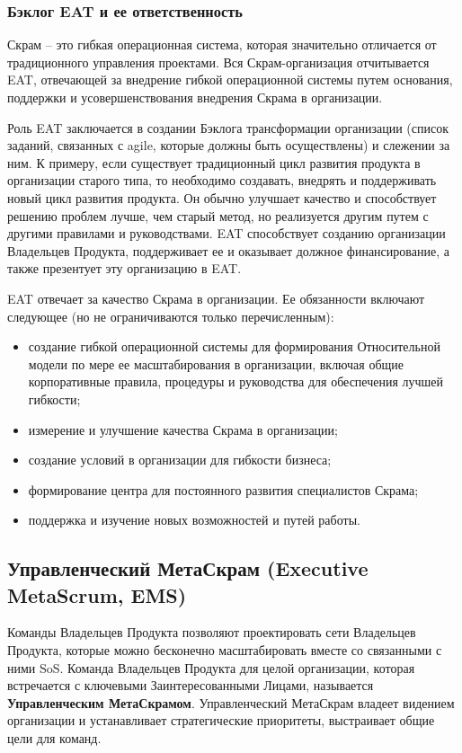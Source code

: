 \documentclass[12pt,a4paper,parskip=full]{scrartcl}
\begin{document}
\subsubsection{Бэклог EAT и ее ответственность}

Скрам – это гибкая операционная система, которая значительно отличается от традиционного управления проектами. Вся Скрам-организация отчитывается EAT, отвечающей за внедрение гибкой операционной системы путем основания, поддержки и усовершенствования внедрения Скрама в организации. 

Роль EAT  заключается в создании Бэклога трансформации организации (список заданий, связанных с agile, которые должны быть осуществлены) и слежении за ним. К примеру, если существует традиционный цикл развития продукта в организации старого типа, то необходимо создавать, внедрять и поддерживать новый цикл развития продукта. Он обычно улучшает качество и способствует решению проблем лучше, чем старый метод, но реализуется другим путем с другими правилами и руководствами. EAT способствует созданию организации Владельцев Продукта, поддерживает ее и оказывает должное финансирование, а также презентует эту организацию в EAT. 

EAT отвечает за качество Скрама в организации. Ее обязанности включают следующее (но не ограничиваются только перечисленным): 

\begin{itemize}
	\item создание гибкой операционной системы для формирования Относительной модели по мере ее масштабирования в организации, включая общие корпоративные правила, процедуры и руководства для обеспечения лучшей гибкости; 
	\item измерение и улучшение качества Скрама в организации;
	\item создание условий в организации для гибкости бизнеса; 
	\item формирование центра для постоянного развития специалистов Скрама; 
	\item поддержка и изучение новых возможностей и путей работы. 
\end{itemize}

\subsection{Управленческий МетаСкрам (Executive MetaScrum, EMS)}

Команды Владельцев Продукта позволяют проектировать сети Владельцев Продукта, которые можно бесконечно масштабировать вместе со связанными с ними SoS. Команда Владельцев Продукта для целой организации, которая встречается с ключевыми Заинтересованными Лицами, называется \textbf{Управленческим МетаСкрамом}. Управленческий МетаСкрам владеет видением организации и устанавливает стратегические приоритеты, выстраивает общие цели для команд.
\end{document}

